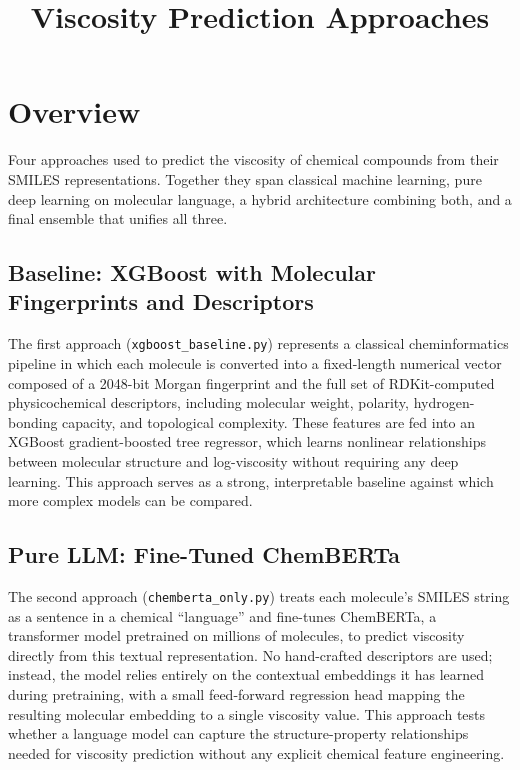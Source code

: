 \documentclass{article}
\title{Viscosity Prediction Approaches}
\author{}
\date{}
\begin{document}
\maketitle

\section{Overview}
Four approaches used to predict the viscosity of chemical compounds from their SMILES representations. Together they span classical machine learning, pure deep learning on molecular language, a hybrid architecture combining both, and a final ensemble that unifies all three.

\subsection{Baseline: XGBoost with Molecular Fingerprints and Descriptors}
The first approach (\texttt{xgboost\_baseline.py}) represents a classical cheminformatics pipeline in which each molecule is converted into a fixed-length numerical vector composed of a 2048-bit Morgan fingerprint and the full set of RDKit-computed physicochemical descriptors, including molecular weight, polarity, hydrogen-bonding capacity, and topological complexity. These features are fed into an XGBoost gradient-boosted tree regressor, which learns nonlinear relationships between molecular structure and log-viscosity without requiring any deep learning. This approach serves as a strong, interpretable baseline against which more complex models can be compared.

\subsection{Pure LLM: Fine-Tuned ChemBERTa}
The second approach (\texttt{chemberta\_only.py}) treats each molecule's SMILES string as a sentence in a chemical ``language'' and fine-tunes ChemBERTa, a transformer model pretrained on millions of molecules, to predict viscosity directly from this textual representation. No hand-crafted descriptors are used; instead, the model relies entirely on the contextual embeddings it has learned during pretraining, with a small feed-forward regression head mapping the resulting molecular embedding to a single viscosity value. This approach tests whether a language model can capture the structure-property relationships needed for viscosity prediction without any explicit chemical feature engineering.
\end{document}
